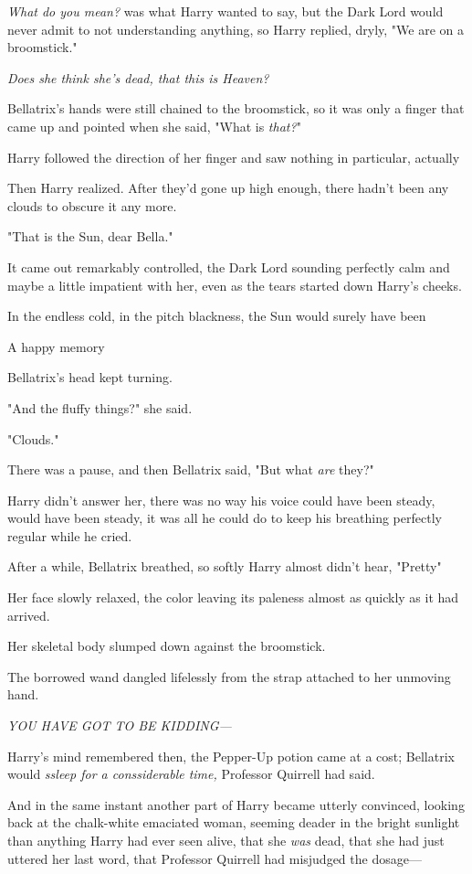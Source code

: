 \emph{What do you mean?} was what Harry wanted to say, but the Dark Lord would
never admit to not understanding anything, so Harry replied, dryly, "We are on
a broomstick."

\emph{Does she think she's dead, that this is Heaven?}

Bellatrix's hands were still chained to the broomstick, so it was only a finger
that came up and pointed when she said, "What is \emph{that?}"

Harry followed the direction of her finger and saw{\el} nothing in
particular, actually{\el}

Then Harry realized. After they'd gone up high enough, there hadn't been any
clouds to obscure it any more.

"That is the Sun, dear Bella."

It came out remarkably controlled, the Dark Lord sounding perfectly calm and
maybe a little impatient with her, even as the tears started down Harry's
cheeks.

In the endless cold, in the pitch blackness, the Sun would surely have
been{\el}

A happy memory{\el}

Bellatrix's head kept turning.

"And the fluffy things?" she said.

"Clouds."

There was a pause, and then Bellatrix said, "But what \emph{are} they?"

Harry didn't answer her, there was no way his voice could have been steady,
would have been steady, it was all he could do to keep his breathing perfectly
regular while he cried.

After a while, Bellatrix breathed, so softly Harry almost didn't hear,
"Pretty{\el}"

Her face slowly relaxed, the color leaving its paleness almost as quickly as it
had arrived.

Her skeletal body slumped down against the broomstick.

The borrowed wand dangled lifelessly from the strap attached to her unmoving
hand.

\emph{YOU HAVE GOT TO BE KIDDING---}

Harry's mind remembered then, the Pepper-Up potion came at a cost; Bellatrix
would \emph{ssleep for a conssiderable time,} Professor Quirrell had said.

And in the same instant another part of Harry became utterly convinced, looking
back at the chalk-white emaciated woman, seeming deader in the bright sunlight
than anything Harry had ever seen alive, that she \emph{was} dead, that she had
just uttered her last word, that Professor Quirrell had misjudged the dosage---

